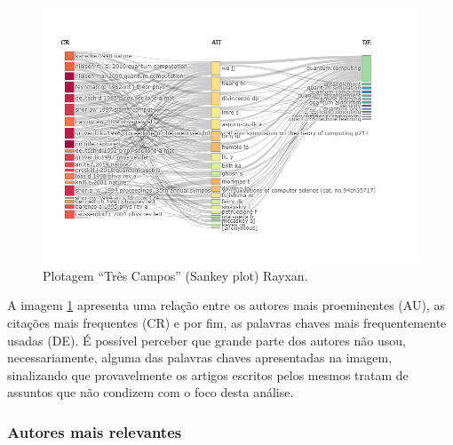 \begin{figure}
    \centering
    \includegraphics[width=1\textwidth]{experiments/Rayxan/PesqBibliogr/ComputacaoQuantica/WoS-20220206/ThreeFieldsPlot.png}
    \caption{Plotagem ``Três Campos'' (Sankey plot) Rayxan.}
    \label{fig:three:fields:Rayxan}
\end{figure}

A imagem \ref{fig:three:fields:Rayxan} apresenta uma relação entre os autores mais proeminentes (AU), as citações mais frequentes (CR) e por fim, as palavras chaves mais frequentemente usadas (DE). É possível perceber que grande parte dos autores não usou, necessariamente, alguma das palavras chaves apresentadas na imagem, sinalizando que provavelmente os artigos escritos pelos mesmos tratam de assuntos que não condizem com o foco desta análise.

\subsubsection{Autores mais relevantes\label{MASSA:Sankey:AutoresRelevantes}}